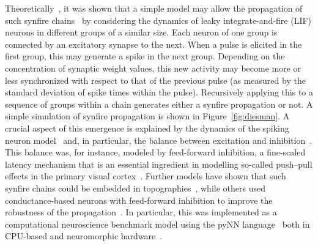 \documentclass[brainsci, %
               review,accept,pdftex,moreauthors
               ]{Definitions/mdpi}
\begin{document}
Theoretically~\citep{deneve_bayesian_2004, ballard_dual_2011}, it was shown that a simple model may allow the propagation of such synfire chains~\citep{gewaltig_propagation_2001} by considering the dynamics of leaky integrate-and-fire (LIF) neurons in different groups of a similar size. Each neuron of one group is connected by an excitatory synapse to the next. When a pulse is elicited in the first group, this may generate a spike in the next group. Depending on the concentration of synaptic weight values, this new activity may become more or less synchronized with respect to that of the previous pulse (as measured by the standard deviation of spike times within the pulse). Recursively applying this to a sequence of groups within a chain generates either a synfire propagation or not. A simple simulation of synfire propagation is shown in Figure~\ref{fig:diesman}. A crucial aspect of this emergence is explained by the dynamics of the spiking neuron model~\citep{gerstner_time_1995} and, in particular, the balance between excitation and inhibition~\citep{azouz_stimulus-selective_2008}. This balance was, for instance, modeled by feed-forward inhibition, a fine-scaled latency mechanism that is an essential ingredient in modelling so-called push--pull effects in the primary visual cortex~\citep{kremkow_push-pull_2016}. Further models have shown that such synfire chains could be embedded in topographies~\citep{aviel_embedding_2003}, while others used conductance-based neurons with feed-forward inhibition to improve the robustness of the propagation~\citep{kremkow_functional_2010}. In particular, this was implemented as a computational neuroscience benchmark model using the pyNN language~\citep{davison_pynn_2008} both in CPU-based and neuromorphic hardware~\citep{pfeil_six_2013}. %
%
\end{document}

